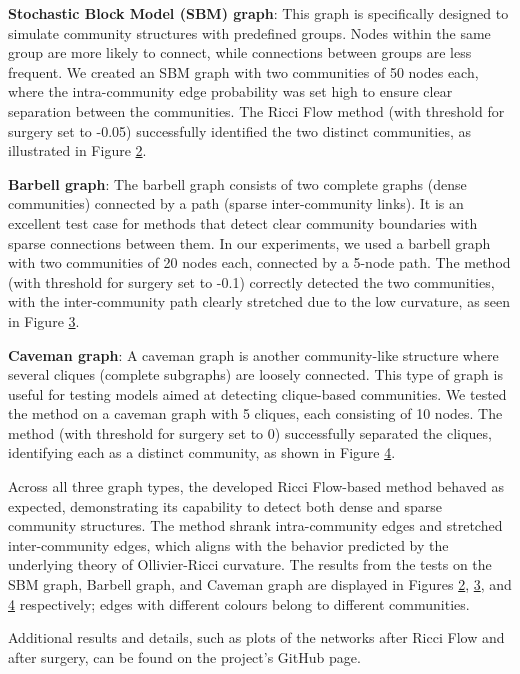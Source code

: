\textbf{Stochastic Block Model (SBM) graph}: This graph is specifically designed to simulate community structures with predefined groups. Nodes within the same group are more likely to connect, while connections between groups are less frequent. We created an SBM graph with two communities of 50 nodes each, where the intra-community edge probability was set high to ensure clear separation between the communities. The Ricci Flow method (with threshold for surgery set to -0.05) successfully identified the two distinct communities, as illustrated in Figure \hyperref[fig2]{2}.

\textbf{Barbell graph}: The barbell graph consists of two complete graphs (dense communities) connected by a path (sparse inter-community links). It is an excellent test case for methods that detect clear community boundaries with sparse connections between them. In our experiments, we used a barbell graph with two communities of 20 nodes each, connected by a 5-node path. The method  (with threshold for surgery set to -0.1) correctly detected the two communities, with the inter-community path clearly stretched due to the low curvature, as seen in Figure \hyperref[fig3]{3}.

\textbf{Caveman graph}: A caveman graph is another community-like structure where several cliques (complete subgraphs) are loosely connected. This type of graph is useful for testing models aimed at detecting clique-based communities. We tested the method on a caveman graph with 5 cliques, each consisting of 10 nodes. The method (with threshold for surgery set to 0) successfully separated the cliques, identifying each as a distinct community, as shown in Figure \hyperref[fig4]{4}.

Across all three graph types, the developed Ricci Flow-based method behaved as expected, demonstrating its capability to detect both dense and sparse community structures. The method shrank intra-community edges and stretched inter-community edges, which aligns with the behavior predicted by the underlying theory of Ollivier-Ricci curvature. The results from the tests on the SBM graph, Barbell graph, and Caveman graph are displayed in Figures \hyperref[fig2]{2}, \hyperref[fig3]{3}, and \hyperref[fig4]{4} respectively; edges with different colours belong to different communities. 

Additional results and details, such as plots of the networks after Ricci Flow and after surgery,  can be found on the project's GitHub page.


